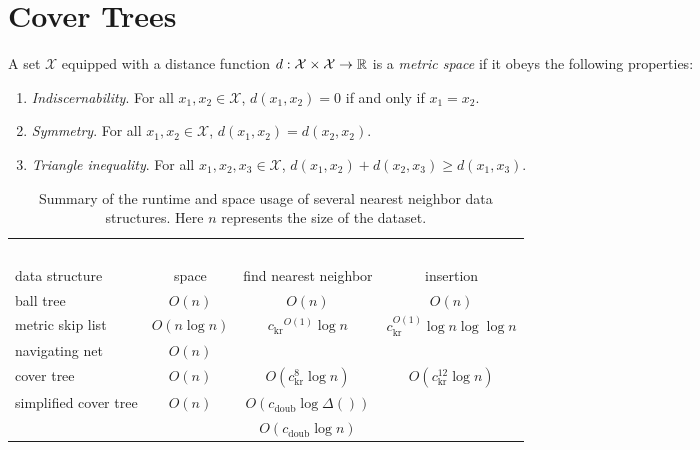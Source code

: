 \documentclass[../main.tex]{subfiles}
\newcommand{\set}[1]{\mathcal {#1}}
\newcommand{\dist}[2]{\distf({#1},{#2})}
\newcommand{\distf}{d}
\newcommand{\aspect}[1]{\Delta({#1})}
\newcommand{\krnum}{c_\text{kr}}
\newcommand{\doubnum}{c_\text{doub}}
\begin{document}
\chapter{Cover Trees}

\begin{definition}
    A set $\set X$ equipped with a distance function $\distf : \set X \times \set X \to \R$ is a \emph{metric space} if it obeys the following properties:
    \begin{enumerate}
        \item \emph{Indiscernability}.  For all $x_1,x_2\in\set X$, $\dist{x_1}{x_2} = 0$ if and only if $x_1=x_2$.
        \item \emph{Symmetry}. For all $x_1,x_2\in\set X$, $\dist{x_1}{x_2} = \dist{x_2}{x_2}$.
        \item \emph{Triangle inequality}.  For all $x_1,x_2,x_3\in\set X$, $\dist{x_1}{x_2} + \dist{x_2}{x_3}\ge\dist{x_1}{x_3}$.
    \end{enumerate}
\end{definition}

\begin{table}[H]
    \small
    \centering
    \begin{tabular}{lccc}
        \toprule
        \vspace{-0.25in}
        &~\hspace{1.2in}~&~\hspace{1.2in}~&~\hspace{1.2in}~\\
        data structure & space & find nearest neighbor & insertion \\
        \midrule
        ball tree \cite{} & $O(n)$ & $O(n)$ & $O(n)$ \\
        metric skip list \cite{karger2002finding} & $O(n\log n)$ & $\krnum{}^{O(1)}\log n$ & $\krnum^{O(1)}\log n\log\log n$ \\
        navigating net \cite{} & $O(n)$ \\
        cover tree \cite{} & $O(n)$ & $O(\krnum^8\log n)$ & $O(\krnum^{12}\log n)$ \\
        simplified cover tree & $O(n)$ & $O(\doubnum{}\log \aspect{})$ \\
                              &        & $O(\doubnum{}\log n)$ \\
        \bottomrule
    \end{tabular}
    \caption{
        Summary of the runtime and space usage of several nearest neighbor data structures.
        Here $n$ represents the size of the dataset.
    }
\end{table}
\end{document}
